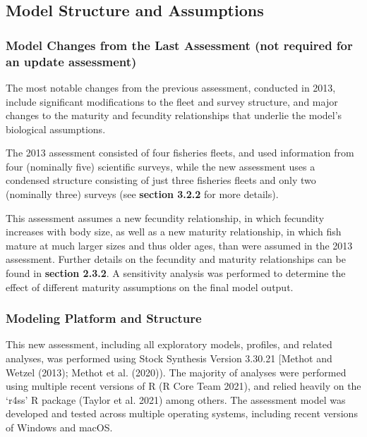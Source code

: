 \documentclass[11pt,
  english,
  letterpaper,
]{article}
\begin{document}
\hypertarget{model-structure-and-assumptions}{%
\subsection{Model Structure and Assumptions}\label{model-structure-and-assumptions}}

\hypertarget{model-changes-from-the-last-assessment-not-required-for-an-update-assessment}{%
\subsubsection{Model Changes from the Last Assessment (not required for an update assessment)}\label{model-changes-from-the-last-assessment-not-required-for-an-update-assessment}}

The most notable changes from the previous assessment, conducted in 2013, include significant modifications to the fleet and survey structure, and major changes to the maturity and fecundity relationships that underlie the model's biological assumptions.

The 2013 assessment consisted of four fisheries fleets, and used information from four (nominally five) scientific surveys, while the new assessment uses a condensed structure consisting of just three fisheries fleets and only two (nominally three) surveys (see \textbf{section 3.2.2} for more details).

This assessment assumes a new fecundity relationship, in which fecundity increases with body size, as well as a new maturity relationship, in which fish mature at much larger sizes and thus older ages, than were assumed in the 2013 assessment. Further details on the fecundity and maturity relationships can be found in \textbf{section 2.3.2}. A sensitivity analysis was performed to determine the effect of different maturity assumptions on the final model output.

\hypertarget{modeling-platform-and-structure}{%
\subsubsection{Modeling Platform and Structure}\label{modeling-platform-and-structure}}

This new assessment, including all exploratory models, profiles, and related analyses, was performed using Stock Synthesis Version 3.30.21 {[}Methot and Wetzel (2013); Methot et al. (2020)). The majority of analyses were performed using multiple recent versions of R (R Core Team 2021), and relied heavily on the `r4ss' R package (Taylor et al. 2021) among others. The assessment model was developed and tested across multiple operating systems, including recent versions of Windows and macOS.
\end{document}
